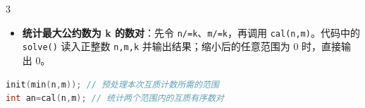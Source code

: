 \documentclass[10pt,landscape,a4paper]{article}
\begin{document}
\begin{multicols*}{3}
\begin{itemize}
\item \textbf{统计最大公约数为 k 的数对}：先令 \texttt{n\allowbreak{}/\allowbreak{}=\allowbreak{}k}、\texttt{m\allowbreak{}/\allowbreak{}=\allowbreak{}k}，再调用 \texttt{c\allowbreak{}a\allowbreak{}l\allowbreak{}(\allowbreak{}n\allowbreak{},\allowbreak{}m\allowbreak{})}。代码中的 \texttt{s\allowbreak{}o\allowbreak{}l\allowbreak{}v\allowbreak{}e\allowbreak{}(\allowbreak{})} 读入正整数 \texttt{n\allowbreak{},\allowbreak{}m\allowbreak{},\allowbreak{}k} 并输出结果；缩小后的任意范围为 $0$ 时，直接输出 $0$。
\end{itemize}
\begin{lstlisting}[language=C++,numbers=none,basicstyle=\footnotesize\ttfamily]
init(min(n,m)); // 预处理本次互质计数所需的范围
int an=cal(n,m); // 统计两个范围内的互质有序数对
\end{lstlisting}


\end{multicols*}
\end{document}
